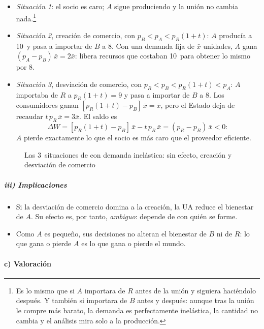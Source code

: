 \documentclass[11pt]{article}
\begin{document}
\begin{itemize}
\item \emph{Situación 1}: el socio es caro; $A$ sigue produciendo y la unión no cambia nada.\footnote{Es lo mismo que si $A$ importara de $R$ antes de la unión y siguiera haciéndolo después. Y también si importara de $B$ antes y después: aunque tras la unión le compre más barato, la demanda es perfectamente inelástica, la cantidad no cambia y el análisis mira solo a la producción.}
\item \emph{Situación 2}, creación de comercio, con $p_B<p_A<p_R(1+t)$: $A$ producía a 10~y pasa a importar de $B$ a 8. Con una demanda fija de $\bar{x}$ unidades, $A$ gana $(p_A-p_B)\,\bar{x}=2\bar{x}$: libera recursos que costaban 10~para obtener lo mismo por 8.
\item \emph{Situación 3}, desviación de comercio, con $p_R<p_B<p_R(1+t)<p_A$: $A$ importaba de $R$ a $p_R(1+t)=9$ y pasa a importar de $B$ a 8. Los consumidores ganan $[p_R(1+t)-p_B]\,\bar{x}=\bar{x}$, pero el Estado deja de recaudar $t\,p_R\,\bar{x}=3\bar{x}$. El saldo es
  \[
  \Delta W=[p_R(1+t)-p_B]\,\bar{x}-t\,p_R\,\bar{x}=(p_R-p_B)\,\bar{x}<0:
  \]
  $A$ pierde exactamente lo que el socio es más caro que el proveedor eficiente.
\end{itemize}

\begin{figure}[H]
\centering
\caption{Las 3~situaciones de  con demanda inelástica: sin efecto, creación y desviación de comercio}\label{fig:viner-situaciones}
\end{figure}

\subparagraph{iii) Implicaciones}

\begin{itemize}
\item Si la desviación de comercio domina a la creación, la UA reduce el bienestar de $A$. Su efecto es, por tanto, \emph{ambiguo}: depende de con quién se forme.
\item Como $A$ es pequeño, sus decisiones no alteran el bienestar de $B$ ni de $R$: lo que gana o pierde $A$ es lo que gana o pierde el mundo.
\end{itemize}

\paragraph{c) Valoración}
\end{document}
